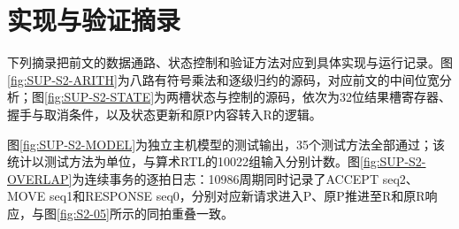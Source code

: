 \section{实现与验证摘录}
下列摘录把前文的数据通路、状态控制和验证方法对应到具体实现与运行记录。图\ref{fig:SUP-S2-ARITH}为八路有符号乘法和逐级归约的源码，对应前文的中间位宽分析；图\ref{fig:SUP-S2-STATE}为两槽状态与控制的源码，依次为32位结果槽寄存器、握手与取消条件，以及状态更新和原P内容转入R的逻辑。

图\ref{fig:SUP-S2-MODEL}为独立主机模型的测试输出，35个测试方法全部通过；该统计以测试方法为单位，与算术RTL的10022组输入分别计数。图\ref{fig:SUP-S2-OVERLAP}为连续事务的逐拍日志：10986周期同时记录了ACCEPT seq2、MOVE seq1和RESPONSE seq0，分别对应新请求进入P、原P推进至R和原R响应，与图\ref{fig:S2-05}所示的同拍重叠一致。

